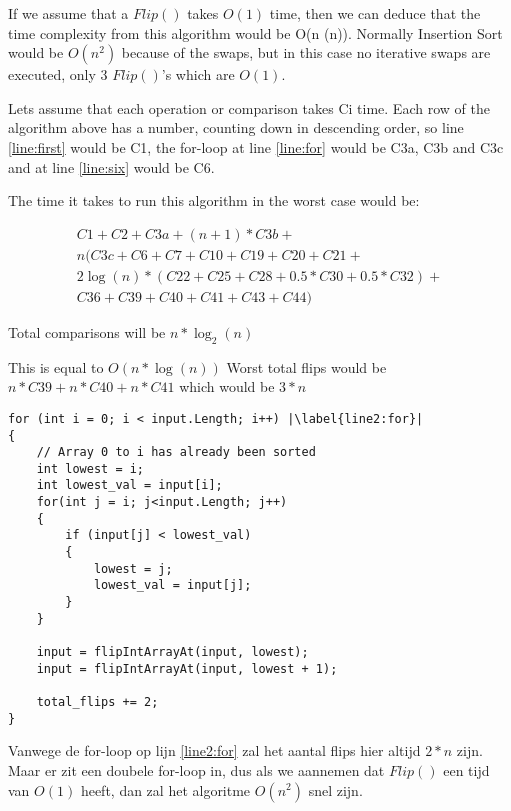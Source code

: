 If we assume that a $Flip()$ takes $O(1)$ time, then we can deduce that the time complexity from this algorithm would be O(n \log(n)). 
Normally Insertion Sort would be $O(n^2)$ because of the swaps, but in this case no iterative swaps are executed, only 3 $Flip()$'s which are $O(1)$.

Lets assume that each operation or comparison takes Ci time. Each row of the algorithm above has a number, counting down in descending order, so line \ref{line:first} would be C1, the for-loop at line \ref{line:for} would be C3a, C3b and C3c and at line \ref{line:six} would be C6.

The time it takes to run this algorithm in the worst case would be:

\begin{align*}
C1 + C2 + C3a + (n+1)*C3b + \\
n(C3c + C6 + C7 + C10 + C19 + C20 + C21 + \\
2\log(n) * (C22 + C25 + C28 + 0.5*C30 + 0.5*C32) + \\
C36 + C39 + C40 + C41 + C43 + C44)
\end{align*}

Total comparisons will be  $n* \log_{2}(n)$

This is equal to $O(n*\log(n))$
Worst total flips would be $n*C39 + n*C40 + n*C41$ which would be $3*n$


\vspace{15mm}

\begin{lstlisting}[caption=Selection Sort variant, escapechar=|]
for (int i = 0; i < input.Length; i++) |\label{line2:for}|
{
    // Array 0 to i has already been sorted
    int lowest = i;
    int lowest_val = input[i];
    for(int j = i; j<input.Length; j++)
    {
        if (input[j] < lowest_val)
        {
            lowest = j;
            lowest_val = input[j];
        }
    }

    input = flipIntArrayAt(input, lowest);
    input = flipIntArrayAt(input, lowest + 1);

    total_flips += 2;
}
\end{lstlisting}

Vanwege de for-loop op lijn \ref{line2:for} zal het aantal flips hier altijd $2*n$ zijn.
Maar er zit een doubele for-loop in, dus als we aannemen dat $Flip()$ een tijd van $O(1)$ heeft, 
dan zal het algoritme $O(n^2)$ snel zijn. 


\vspace{15mm}

